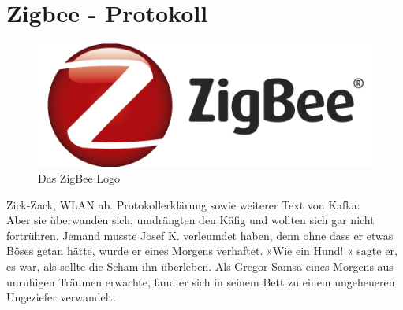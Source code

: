 \section{Zigbee - Protokoll}\label{s:Grundlagen}


\begin{figure}[H] 
	\centering
	\includegraphics[scale=0.5]{Bilder/zigbee-logo}
	\caption{Das ZigBee Logo}
	\label{f:zigbeelogo}
\end{figure}


Zick-Zack, WLAN ab. Protokollerklärung sowie weiterer Text von Kafka:\\
Aber sie überwanden sich, umdrängten den Käfig und wollten sich gar nicht fortrühren. Jemand musste Josef K. verleumdet haben, denn ohne dass er etwas Böses getan hätte, wurde er eines Morgens verhaftet. »Wie ein Hund! « sagte er, es war, als sollte die Scham ihn überleben. Als Gregor Samsa eines Morgens aus unruhigen Träumen erwachte, fand er sich in seinem Bett zu einem ungeheueren Ungeziefer verwandelt.